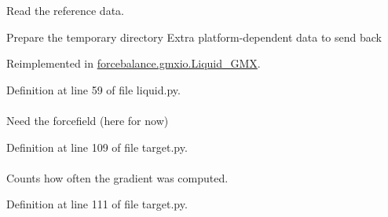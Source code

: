 \-Read the reference data. 

\-Prepare the temporary directory \-Extra platform-\/dependent data to send back 

\-Reimplemented in \hyperlink{classforcebalance_1_1gmxio_1_1Liquid__GMX_ac9f30f5bafc9355de1694e3e2e7e8871}{forcebalance.\-gmxio.\-Liquid\-\_\-\-G\-M\-X}.



\-Definition at line 59 of file liquid.\-py.

\hypertarget{classforcebalance_1_1target_1_1Target_a796dc30a19a60c63fb43b088d40a963f}{
\paragraph[{\-F\-F}]{}}\label{classforcebalance_1_1target_1_1Target_a796dc30a19a60c63fb43b088d40a963f}


\-Need the forcefield (here for now) 



\-Definition at line 109 of file target.\-py.

\hypertarget{classforcebalance_1_1target_1_1Target_aff6e42b84dd8eb5a4dc3b47aa58bc64c}{
\paragraph[{gct}]{}}\label{classforcebalance_1_1target_1_1Target_aff6e42b84dd8eb5a4dc3b47aa58bc64c}


\-Counts how often the gradient was computed. 



\-Definition at line 111 of file target.\-py.

